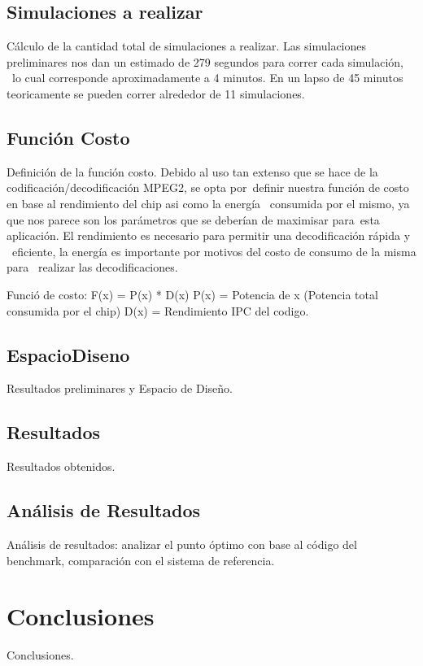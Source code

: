 \documentclass[journal]{IEEEtran}
\begin{document}
\subsection{Simulaciones a realizar}
C\'{a}lculo de la cantidad total de simulaciones a realizar.
Las simulaciones preliminares nos dan un estimado de 279 segundos para correr cada simulaci\'{o}n, \
lo cual corresponde aproximadamente a 4 minutos.  En un lapso de 45 minutos teoricamente se pueden correr alrededor de 11 simulaciones.


\subsection{Funci\'{o}n Costo}
Definici\'{o}n de la funci\'{o}n costo.
Debido al uso tan extenso que se hace de la codificaci\'{o}n/decodificaci\'{o}n MPEG2, se opta por\
definir nuestra funci\'{o}n de costo en base al rendimiento del chip asi como la energ\'{i}a \
consumida por el mismo, ya que nos parece son los par\'{a}metros que se deber\'{i}an de maximisar para\
esta aplicaci\'{o}n.  El rendimiento es necesario para permitir una decodificaci\'{o}n r\'{a}pida y \
eficiente, la energ\'{i}a es importante por motivos del costo de consumo de la misma para \
realizar las decodificaciones.

Funci\'{o} de costo:     F(x) = P(x) * D(x)
P(x) = Potencia de x (Potencia total consumida por el chip)
D(x) = Rendimiento IPC del codigo.

\subsection{EspacioDiseno}
Resultados preliminares y Espacio de Dise\~no.


\subsection{Resultados}
Resultados obtenidos.

\subsection{An\'{a}lisis de Resultados}
An\'{a}lisis de resultados: analizar el punto \'{o}ptimo con base al c\'{o}digo del benchmark, comparaci\'{o}n con el sistema de referencia.

\section{Conclusiones}
Conclusiones.
\end{document}

